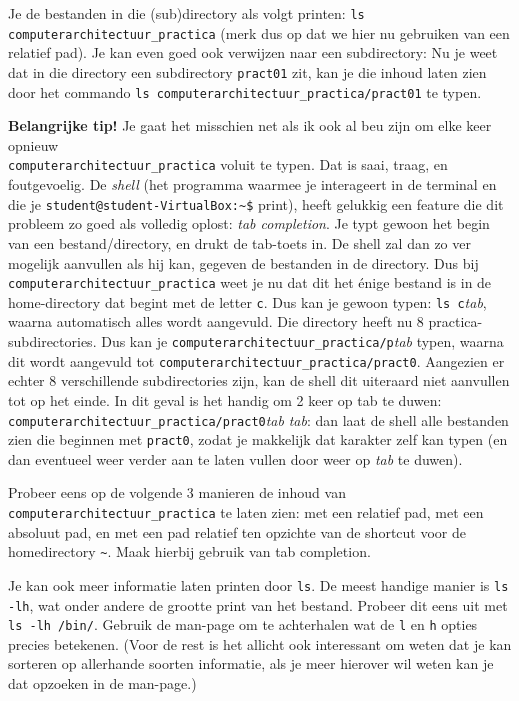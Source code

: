 \documentclass[a4paper,twoside,openany]{memoir}
\begin{document}
Je de bestanden in die (sub)directory als volgt printen: \verb!ls computerarchitectuur_practica!
(merk dus op dat we hier nu gebruiken van een relatief pad). Je kan even
goed ook verwijzen naar een subdirectory: Nu je weet dat in die directory
een subdirectory \verb!pract01!
zit, kan je die inhoud laten zien door het commando
\verb!ls computerarchitectuur_practica/pract01!
te typen.


\textbf{Belangrijke tip!} Je gaat het misschien net als ik ook al beu zijn om
elke keer opnieuw\\
\verb!computerarchitectuur_practica! voluit te typen. Dat is
saai, traag, en foutgevoelig. De \emph{shell} (het programma waarmee je
interageert in de terminal en die je \verb!student@student-VirtualBox:~$!
print), heeft gelukkig een feature die dit probleem zo goed als volledig oplost:
\emph{tab completion}. Je typt gewoon het begin van een bestand/directory, en
drukt de tab-toets in. De shell zal dan zo ver mogelijk aanvullen als hij kan,
gegeven de bestanden in de directory. Dus bij
\verb!computerarchitectuur_practica! weet je nu dat dit het \'enige bestand is
in de home-directory dat begint met de letter \verb!c!. Dus kan je gewoon typen:
\verb!ls c!\emph{tab}, waarna automatisch alles wordt aangevuld. Die directory
heeft nu 8 practica-subdirectories. Dus kan je
\verb!computerarchitectuur_practica/p!\emph{tab} typen, waarna dit wordt
aangevuld tot \verb!computerarchitectuur_practica/pract0!. Aangezien er echter 8
verschillende subdirectories zijn, kan de shell dit uiteraard niet aanvullen tot
op het einde. In dit geval is het handig om 2 keer op tab te duwen:
\verb!computerarchitectuur_practica/pract0!\emph{tab} \emph{tab}: dan laat de
shell alle bestanden zien die beginnen met \verb!pract0!, zodat je makkelijk dat
karakter zelf kan typen (en dan eventueel weer verder aan te laten vullen door
weer op \emph{tab} te duwen).

Probeer eens op de volgende 3 manieren de inhoud van
\verb!computerarchitectuur_practica! te laten zien: met een relatief pad, met
een absoluut pad, en met een pad relatief ten opzichte van de shortcut voor de
homedirectory \verb!~!. Maak hierbij gebruik van tab completion.

Je kan ook meer informatie laten printen door \verb!ls!. De meest handige manier
is \verb!ls -lh!, wat onder andere de grootte print van het bestand. Probeer dit
eens uit met \verb!ls -lh /bin/!. Gebruik de man-page om te achterhalen wat de
\verb!l! en \verb!h! opties precies betekenen. (Voor de rest is het allicht ook
interessant om weten dat je kan sorteren op allerhande soorten informatie, als
je meer hierover wil weten kan je dat opzoeken in de man-page.)
\end{document}
